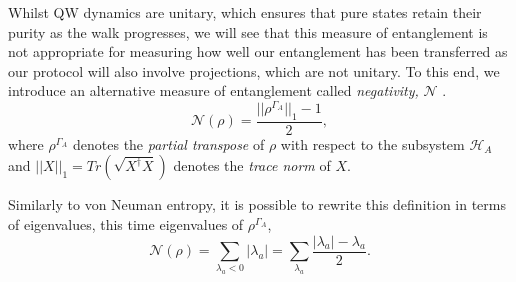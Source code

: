 Whilst QW dynamics are unitary, which ensures that pure states retain their purity as the walk progresses, we will see that this measure of entanglement is not appropriate for measuring how well our entanglement has been transferred as our protocol will also involve projections, which are not unitary.
To this end, we introduce an alternative measure of entanglement called \emph{negativity,} $\mathcal{N}$ \cite{Vidal_2002}.
\begin{equation}
    \mathcal{N}(\rho) = \frac{||\rho^{\Gamma_A}||_1-1}{2},
\end{equation}
where $\rho^{\Gamma_A}$ denotes the \emph{partial transpose} of $\rho$ with respect to the subsystem $\mathcal{H}_A$ and $||X||_1 = Tr(\sqrt{X^\dagger X})$ denotes the \emph{trace norm} of $X$.\newline

Similarly to von Neuman entropy, it is possible to rewrite this definition in terms of eigenvalues, this time eigenvalues of $\rho^{\Gamma_A}$,
\begin{equation}
    \mathcal{N}(\rho) = \sum_{\lambda_a < 0}|\lambda_a| = \sum_{\lambda_a} \frac{|\lambda_a| - \lambda_a}{2}.
\end{equation}